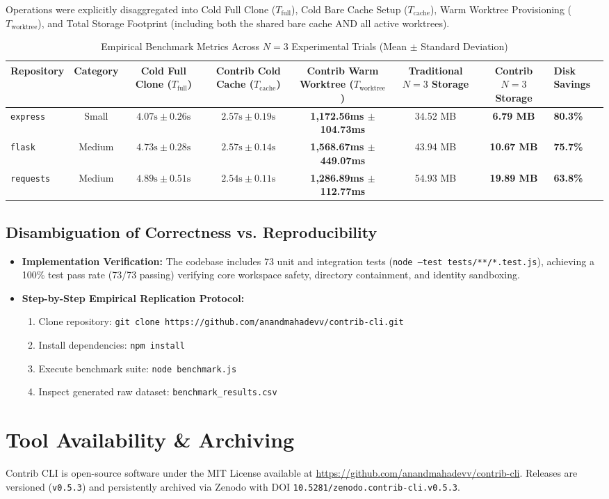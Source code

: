 \documentclass[10pt,conference]{IEEEtran}
\begin{document}
Operations were explicitly disaggregated into Cold Full Clone ($T_{\text{full}}$), Cold Bare Cache Setup ($T_{\text{cache}}$), Warm Worktree Provisioning ($T_{\text{worktree}}$), and Total Storage Footprint (including both the shared bare cache AND all active worktrees).

\begin{table}[t]
\centering
\caption{Empirical Benchmark Metrics Across $N=3$ Experimental Trials (Mean $\pm$ Standard Deviation)}
\label{tab:benchmarks}
\begin{tabular}{lcccccc}
\toprule
\textbf{Repository} & \textbf{Category} & \textbf{Cold Full Clone ($T_{\text{full}}$)} & \textbf{Contrib Cold Cache ($T_{\text{cache}}$)} & \textbf{Contrib Warm Worktree ($T_{\text{worktree}}$)} & \textbf{Traditional $N=3$ Storage} & \textbf{Contrib $N=3$ Storage} & \textbf{Disk Savings} \\
\midrule
\texttt{express} & Small & $4.07\text{s} \pm 0.26\text{s}$ & $2.57\text{s} \pm 0.19\text{s}$ & \textbf{1,172.56ms $\pm$ 104.73ms} & 34.52 MB & \textbf{6.79 MB} & \textbf{80.3\%} \\
\texttt{flask} & Medium & $4.73\text{s} \pm 0.28\text{s}$ & $2.57\text{s} \pm 0.14\text{s}$ & \textbf{1,568.67ms $\pm$ 449.07ms} & 43.94 MB & \textbf{10.67 MB} & \textbf{75.7\%} \\
\texttt{requests} & Medium & $4.89\text{s} \pm 0.51\text{s}$ & $2.54\text{s} \pm 0.11\text{s}$ & \textbf{1,286.89ms $\pm$ 112.77ms} & 54.93 MB & \textbf{19.89 MB} & \textbf{63.8\%} \\
\bottomrule
\end{tabular}
\end{table}

\subsection{Disambiguation of Correctness vs. Reproducibility}
\begin{itemize}
    \item \textbf{Implementation Verification:} The codebase includes 73 unit and integration tests (\texttt{node --test tests/**/*.test.js}), achieving a 100\% test pass rate (73/73 passing) verifying core workspace safety, directory containment, and identity sandboxing.
    \item \textbf{Step-by-Step Empirical Replication Protocol:}
    \begin{enumerate}
        \item Clone repository: \texttt{git clone https://github.com/anandmahadevv/contrib-cli.git}
        \item Install dependencies: \texttt{npm install}
        \item Execute benchmark suite: \texttt{node benchmark.js}
        \item Inspect generated raw dataset: \texttt{benchmark\_results.csv}
    \end{enumerate}
\end{itemize}

\section{Tool Availability \& Archiving}
Contrib CLI is open-source software under the MIT License available at \url{https://github.com/anandmahadevv/contrib-cli}. Releases are versioned (\texttt{v0.5.3}) and persistently archived via Zenodo with DOI \texttt{10.5281/zenodo.contrib-cli.v0.5.3}.
\end{document}
